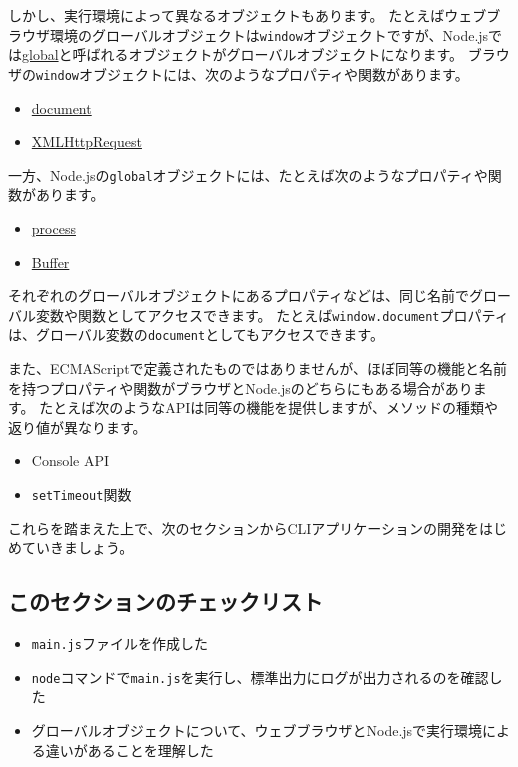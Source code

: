 しかし、実行環境によって異なるオブジェクトもあります。
たとえばウェブブラウザ環境のグローバルオブジェクトは\texttt{window}オブジェクトですが、Node.jsでは\href{https://nodejs.org/docs/latest-v12.x/api/globals.html}{global}と呼ばれるオブジェクトがグローバルオブジェクトになります。
ブラウザの\texttt{window}オブジェクトには、次のようなプロパティや関数があります。

\begin{itemize}
\item
  \href{https://developer.mozilla.org/ja/docs/Web/API/Document}{document}
\item
  \href{https://developer.mozilla.org/ja/docs/Web/API/XMLHttpRequest}{XMLHttpRequest}
\end{itemize}

一方、Node.jsの\texttt{global}オブジェクトには、たとえば次のようなプロパティや関数があります。

\begin{itemize}
\item
  \href{https://nodejs.org/docs/latest-v12.x/api/process.html\#process_process}{process}
\item
  \href{https://nodejs.org/docs/latest-v12.x/api/buffer.html}{Buffer}
\end{itemize}

それぞれのグローバルオブジェクトにあるプロパティなどは、同じ名前でグローバル変数や関数としてアクセスできます。
たとえば\texttt{window.document}プロパティは、グローバル変数の\texttt{document}としてもアクセスできます。

また、ECMAScriptで定義されたものではありませんが、ほぼ同等の機能と名前を持つプロパティや関数がブラウザとNode.jsのどちらにもある場合があります。
たとえば次のようなAPIは同等の機能を提供しますが、メソッドの種類や返り値が異なります。

\begin{itemize}
\item
  Console API
\item
  \texttt{setTimeout}関数
\end{itemize}

これらを踏まえた上で、次のセクションからCLIアプリケーションの開発をはじめていきましょう。

\hypertarget{section-checklist}{%
\subsection{このセクションのチェックリスト}\label{section-checklist}}

\begin{itemize}
\item
  \texttt{main.js}ファイルを作成した
\item
  \texttt{node}コマンドで\texttt{main.js}を実行し、標準出力にログが出力されるのを確認した
\item
  グローバルオブジェクトについて、ウェブブラウザとNode.jsで実行環境による違いがあることを理解した
\end{itemize}

